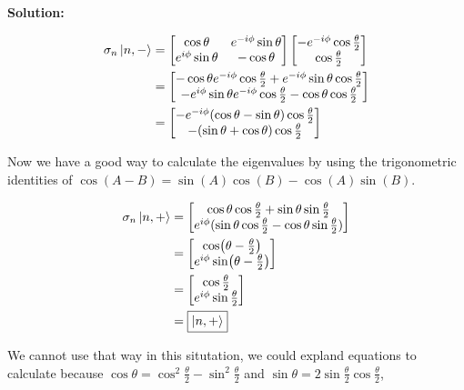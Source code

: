 \documentclass[11pt]{article}
\newenvironment{solution}
{\par\noindent\textbf{Solution:}\par}
{\vspace{1em}}
\begin{document}
\begin{solution}
\[\begin{aligned}
\sigma_n\ket{n,-} & = \begin{bmatrix}\cos{\theta} & e^{-i\phi}\sin{\theta} \\ e^{i\phi}\sin{\theta} & -\cos{\theta}\end{bmatrix} \begin{bmatrix}-e^{-i\phi}\cos{\frac{\theta}{2}} \\ \cos{\frac{\theta}{2}}\end{bmatrix} \\
&= \begin{bmatrix}-\cos{\theta}e^{-i\phi}\cos{\frac{\theta}{2}} + e^{-i\phi}\sin{\theta}\cos{\frac{\theta}{2}} \\ -e^{i\phi}\sin{\theta}e^{-i\phi}\cos{\frac{\theta}{2}} - \cos{\theta}\cos{\frac{\theta}{2}}\end{bmatrix} \\
&= \begin{bmatrix}-e^{-i\phi}(\cos{\theta} - \sin{\theta})\cos{\frac{\theta}{2}} \\ -(\sin{\theta} + \cos{\theta})\cos{\frac{\theta}{2}}\end{bmatrix}
\end{aligned}\]

Now we have a good way to calculate the eigenvalues by using the trigonometric identities of $\cos(A-B) = \sin(A)\cos(B) - \cos(A)\sin(B)$.

\[\begin{aligned}
\sigma_n\ket{n,+} & = \begin{bmatrix}\cos{\theta}\cos{\frac{\theta}{2}} + \sin{\theta}\sin{\frac{\theta}{2}} \\ e^{i\phi}(\sin{\theta}\cos{\frac{\theta}{2}} - \cos{\theta}\sin{\frac{\theta}{2}})\end{bmatrix} \\
&= \begin{bmatrix}\cos(\theta - \frac{\theta}{2}) \\ e^{i\phi}\sin(\theta - \frac{\theta}{2})\end{bmatrix} \\
&= \begin{bmatrix}\cos{\frac{\theta}{2}} \\ e^{i\phi}\sin{\frac{\theta}{2}}\end{bmatrix} \\
&= \boxed{\ket{n,+}}
\end{aligned}\]

We cannot use that way in this situtation, we could expland equations to calculate because $\cos{\theta} = \cos^2{\frac{\theta}{2}} - \sin^2{\frac{\theta}{2}}$ and $\sin{\theta} = 2\sin{\frac{\theta}{2}}\cos{\frac{\theta}{2}}$,


\end{solution}
\end{document}
